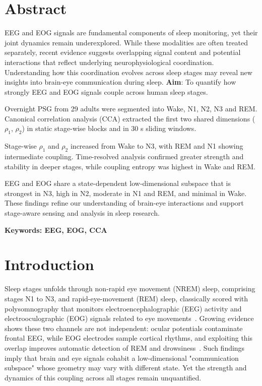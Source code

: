 



\maketitle

\section{Abstract}

EEG and EOG signals are fundamental components of sleep monitoring, yet their joint dynamics remain underexplored. While these modalities are often treated separately, recent evidence suggests overlapping signal content and potential interactions that reflect underlying neurophysiological coordination. Understanding how this coordination evolves across sleep stages may reveal new insights into brain-eye communication during sleep.
\textbf{Aim}: To quantify how strongly EEG and EOG signals couple across human sleep stages.

Overnight PSG from 29 adults were segmented into Wake, N1, N2, N3 and REM. Canonical correlation analysis (CCA) extracted the first two shared dimensions ($\rho_1$, $\rho_2$) in static stage-wise blocks and in 30 s sliding windows.

Stage-wise $\rho_1$ and $\rho_2$ increased from Wake to N3, with REM and N1 showing intermediate coupling. Time-resolved analysis confirmed greater strength and stability in deeper stages, while coupling entropy was highest in Wake and REM.

EEG and EOG share a state-dependent low-dimensional subspace that is strongest in N3, high in N2, moderate in N1 and REM, and minimal in Wake. These findings refine our understanding of brain-eye interactions and support stage-aware sensing and analysis in sleep research.

\textbf{Keywords: EEG, EOG, CCA}

\section{Introduction}

Sleep stages unfolds through non-rapid eye movement (NREM) sleep, comprising stages N1 to N3, and rapid-eye-movement (REM) sleep, classically scored with polysomnography that monitors electroencephalographic (EEG) activity and electrooculographic (EOG) signals related to eye movements~\cite{liu2021}. Growing evidence shows these two channels are not independent: ocular potentials contaminate frontal EEG, while EOG electrodes sample cortical rhythms, and exploiting this overlap improves automatic detection of REM and drowsiness~\cite{xu2025, safieddine2012}. Such findings imply that brain and eye signals cohabit a low-dimensional "communication subspace" whose geometry may vary with different state. Yet the strength and dynamics of this coupling across all stages remain unquantified.

